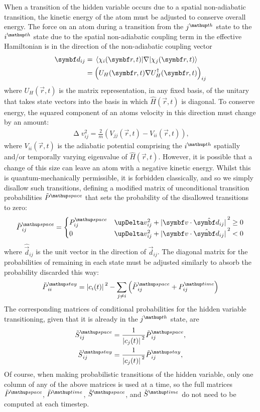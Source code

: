 When a transition of the hidden variable occurs due to a spatial non-adiabatic transition, the kinetic energy of the atom must be adjusted to conserve overall energy. The force on an atom during a transition from the $j^\up{th}$ state to the $i^\up{th}$ state due to the spatial non-adiabatic coupling term in the effective Hamiltonian is in the direction of the non-adiabatic coupling vector
\begin{align}
\vec d_{ij} &= \matrixel{\chi_i(\vec r, t)}{\nabla}{\chi_j(\vec r, t)}\\
&= \left(U_H(\vec r, t)\nabla U_H^\dagger(\vec r, t)\right)_{ij}
\end{align}
where $U_H(\vec r, t)$ is the matrix representation, in any fixed basis, of the unitary that takes state vectors into the basis in which $\hat H(\vec r, t)$ is diagonal. To conserve energy, the squared component of an atoms velocity in this direction must change by an amount:
\begin{align}
\upDelta v_{ij}^2 = \frac2m\left(V_{jj}(\vec r, t) - V_{ii}(\vec r, t)\right),
\end{align}
where $V_{ii}(\vec r, t)$ is the adiabatic potential comprising the $i^\up{th}$ spatially and/or temporally varying eigenvalue of $\hat H(\vec r, t)$. However, it is possible that a change of this size can leave an atom with a negative kinetic energy. Whilst this is quantum-mechanically permissible, it is forbidden classically, and so we simply disallow such transitions, defining a modified matrix of unconditional transition probabilities $\tilde P^\up{space}$ that sets the probability of the disallowed transitions to zero:
\begin{align}
\tilde P^\up{space}_{ij} =
\begin{cases}
P^\up{space}_{ij} & \upDelta v_{ij}^2 + \abs{\vec v\cdot\hat{\vec d_{ij}}}^2 \geq 0 \\
0 & \upDelta v_{ij}^2 + \abs{\vec v\cdot\hat{\vec d}_{ij}}^2 < 0
\end{cases}
\end{align}
where $\hat{\vec d}_{ij}$ is the unit vector in the direction of $\vec d_{ij}$.
The diagonal matrix for the probabilities of remaining in each state must be adjusted similarly to absorb the probability discarded this way:
\begin{align}
\tilde P^\up{stay}_{ii} = 
\abs{c_i(t)}^2 - \sum_{j\neq i}\left(\tilde P^\up{space}_{ij} + P^\up{time}_{ij}\right)
\end{align}
The corresponding matrices of conditional probabilities for the hidden variable transitioning, given that it is already in the $j^\up{th}$ state, are
\begin{align}
\tilde S^\up{space}_{ij} &= \frac1{\abs{c_j(t)}^2} \tilde P^\up{space}_{ij},\\
\tilde S^\up{stay}_{ij} &= \frac1{\abs{c_j(t)}^2} \tilde P^\up{stay}_{ij},
\end{align}
Of course, when making probabilistic transitions of the hidden variable, only one
column of any of the above matrices is used at a time, so the full matrices $\tilde P^\up{space}$, $\tilde P^\up{time}$, $\tilde S^\up{space}$, and $\tilde S^\up{time}$ do not need to be computed at each timestep.

